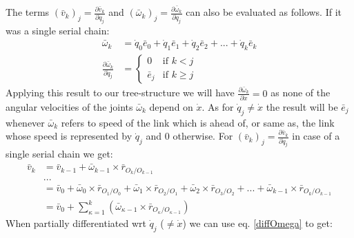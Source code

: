 \documentclass[a4paper,10pt]{article}
\begin{document}
The terms $\left(\bar{v}_k\right)_j = \frac{\partial \bar{v}_k }{\partial \dot{q}_j}$ and $\left( \bar\omega_k \right)_j = \frac{\partial \bar\omega_k}{\partial \dot{q}_j}$ can also be evaluated as follows. If it was a single serial chain:
\begin{align}
 \bar\omega_k &= \dot{q}_0\bar{e}_0 + \dot{q}_1\bar{e}_1 + \dot{q}_2\bar{e}_2 + ... + \dot{q}_k\bar{e}_k \nonumber \\
 \frac{\partial \bar\omega_k}{\partial \dot{q}_j} &= \begin{cases}
                                                      0         & \mbox{if } k < j \\
                                                      \bar{e}_j & \mbox{if } k \geq j 
                                                     \end{cases} \label{diffOmega}
\end{align}
Applying this result to our tree-structure we will have $\frac{\partial \bar\omega_k}{\partial \dot{x}} = 0$ as none of the angular velocities of the joints $\bar\omega_k$ depend on $\dot{x}$. As for $\dot{q}_j \neq \dot{x}$ the result will be $\bar{e}_j$ whenever $\bar\omega_k$ refers to speed of the link which is ahead of, or same as, the link whose speed is represented by $\dot{q}_j$ and $0$ otherwise.
For $\left(\bar{v}_k\right)_j = \frac{\partial \bar{v}_k }{\partial \dot{q}_j}$ in case of a single serial chain we get:
\begin{align}
 \bar{v}_k &=  \bar{v}_{k-1} + \bar\omega_{k-1} \times \bar{r}_{O_{k}/O_{k-1}} \nonumber \\
 &...  \nonumber \\
 &= \bar{v}_0 + \bar\omega_0 \times \bar{r}_{O_1/O_0} + \bar\omega_1 \times \bar{r}_{O_2/O_1} + \bar\omega_2 \times \bar{r}_{O_3/O_2} + ... + \bar\omega_{k-1} \times \bar{r}_{O_{k}/O_{k-1}} \nonumber \\
 &= \bar{v}_0 + \sum\limits_{\kappa=1}^k \left( \bar\omega_{\kappa-1} \times \bar{r}_{O_\kappa/O_{\kappa-1}} \right)
\end{align} 
When partially differentiated wrt $\dot{q}_j$ ($\neq \dot{x}$) we can use eq. \ref{diffOmega} to get:
\end{document}
